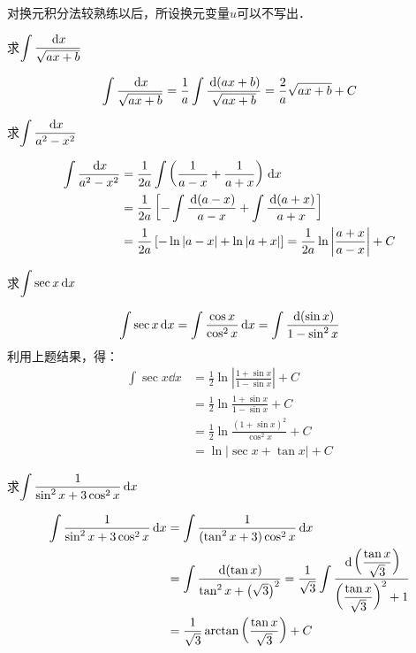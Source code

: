 对换元积分法较熟练以后，所设换元变量$u$可以不写出．

\begin{example}
求$\displaystyle\int \dfrac{\,{\rm d} x}{\sqrt{ax+b}}$
\end{example}

\begin{solution}
    \[\displaystyle\int \dfrac{\,{\rm d} x}{\sqrt{ax+b}}=\dfrac{1}{a}\int \dfrac{\,{\rm d}(ax+b)}{\sqrt{ax+b}}=\dfrac{2}{a}\sqrt{ax+b}+C\]
\end{solution}

\begin{example}
    求$\displaystyle\int \dfrac{\,{\rm d} x}{a^2-x^2}$
\end{example}

\begin{solution}
\[\begin{split}
    \displaystyle\int \dfrac{\,{\rm d} x}{a^2-x^2}&=\dfrac{1}{2a}\int\left(\dfrac{1}{a-x}+\dfrac{1}{a+x}\right)\,{\rm d} x\\
    &=\dfrac{1}{2a}\left[-\int\dfrac{\,{\rm d}(a-x)}{a-x}+\int\dfrac{\,{\rm d}(a+x)}{a+x}\right]\\
    &=\dfrac{1}{2a}\left[-\ln|a-x|+\ln|a+x|\right]=\dfrac{1}{2a}\ln\left|\dfrac{a+x}{a-x}\right|+C
\end{split}\]
\end{solution}

\begin{example}
    求$\displaystyle\int \sec x\,{\rm d} x$
\end{example}

\begin{solution}
    \[\displaystyle\int \sec x\,{\rm d} x=\int \dfrac{\cos x}{\cos^2 x}\,{\rm d} x=\int \dfrac{\,{\rm d}(\sin x)}{1-\sin^2 x}\]
利用上题结果，得：
\[\begin{split}
    \int \sec x\dd x&=\frac{1}{2}\ln\left|\frac{1+\sin x}{1-\sin x}\right|+C\\
    &=\frac{1}{2}\ln\frac{1+\sin x}{1-\sin x}+C\\
    &=\frac{1}{2}\ln\frac{(1+\sin x)^2}{\cos^2 x}+C\\
    &=\ln|\sec x+\tan x|+C
\end{split}\]

\end{solution}

\begin{example}
    求$\displaystyle\int \dfrac{1}{\sin^2x +3\cos^2x}\,{\rm d} x$
\end{example}

\begin{solution}
    \[\begin{split}
        \displaystyle\int \dfrac{1}{\sin^2x +3\cos^2x}\,{\rm d} x&=\displaystyle\int \dfrac{1}{(\tan^2x +3)\cos^2x}\,{\rm d} x\\
        &=\int \dfrac{\,{\rm d} (\tan x)}{\tan^2 x+\left(\sqrt{3}\right)^2}=\dfrac{1}{\sqrt{3}}\int \dfrac{\,{\rm d}\left(\dfrac{\tan x}{\sqrt{3}}\right)}{\left(\dfrac{\tan x}{\sqrt{3}}\right)^2+1}\\
        &=\dfrac{1}{\sqrt{3}}\arctan\left(\dfrac{\tan x}{\sqrt{3}}\right)+C      
    \end{split}\]
\end{solution}

